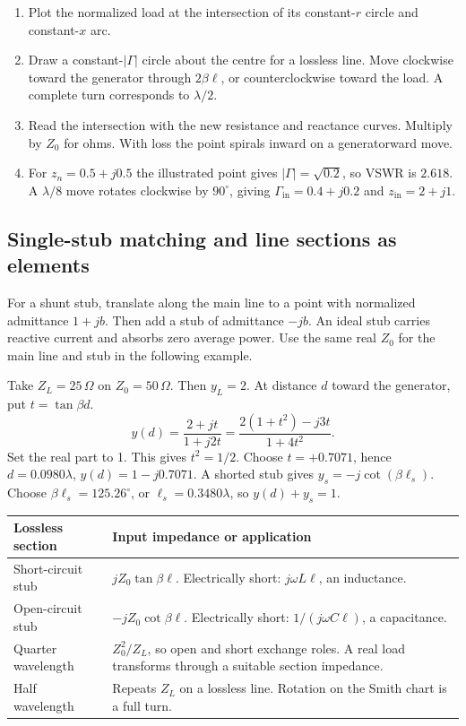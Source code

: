\documentclass[12pt,a4paper]{article}
\begin{document}
\begin{enumerate}[leftmargin=*,itemsep=3pt]
\item Plot the normalized load at the intersection of its constant-$r$ circle and constant-$x$ arc.
\item Draw a constant-$|\Gamma|$ circle about the centre for a lossless line. Move clockwise toward the generator through $2\beta\ell$, or counterclockwise toward the load. A complete turn corresponds to $\lambda/2$.
\item Read the intersection with the new resistance and reactance curves. Multiply by $Z_0$ for ohms. With loss the point spirals inward on a generatorward move.
\item For $z_n=0.5+j0.5$ the illustrated point gives $|\Gamma|=\sqrt{0.2}$, so VSWR is $2.618$. A $\lambda/8$ move rotates clockwise by $90^\circ$, giving $\Gamma_{\mathrm{in}}=0.4+j0.2$ and $z_{\mathrm{in}}=2+j1$.
\end{enumerate}

\subsection{Single-stub matching and line sections as elements}
For a shunt stub, translate along the main line to a point with normalized admittance $1+jb$. Then add a stub of admittance $-jb$. An ideal stub carries reactive current and absorbs zero average power. Use the same real $Z_0$ for the main line and stub in the following example.
\begin{tcolorbox}[examplebox,title={Shunt shorted-stub match in admittance form}]
Take $Z_L=25\,\Omega$ on $Z_0=50\,\Omega$. Then $y_L=2$. At distance $d$ toward the generator, put $t=\tan\beta d$.
\[
 y(d)=\frac{2+jt}{1+j2t}
      =\frac{2(1+t^2)-j3t}{1+4t^2}.
\]
Set the real part to 1. This gives $t^2=1/2$. Choose $t=+0.7071$, hence $d=0.0980\lambda$, $y(d)=1-j0.7071$. A shorted stub gives $y_s=-j\cot(\beta\ell_s)$. Choose $\beta\ell_s=125.26^\circ$, or $\ell_s=0.3480\lambda$, so $y(d)+y_s=1$.
\end{tcolorbox}
\par\vspace{6pt}\noindent
\begin{tabularx}{\linewidth}{|B{4cm}|Y|}\hline
Lossless section & Input impedance or application \\ \hline
Short-circuit stub & $jZ_0\tan\beta\ell$. Electrically short: $j\omega L\ell$, an inductance. \\ \hline
Open-circuit stub & $-jZ_0\cot\beta\ell$. Electrically short: $1/(j\omega C\ell)$, a capacitance. \\ \hline
Quarter wavelength & $Z_0^2/Z_L$, so open and short exchange roles. A real load transforms through a suitable section impedance. \\ \hline
Half wavelength & Repeats $Z_L$ on a lossless line. Rotation on the Smith chart is a full turn. \\ \hline
\end{tabularx}
\end{document}
